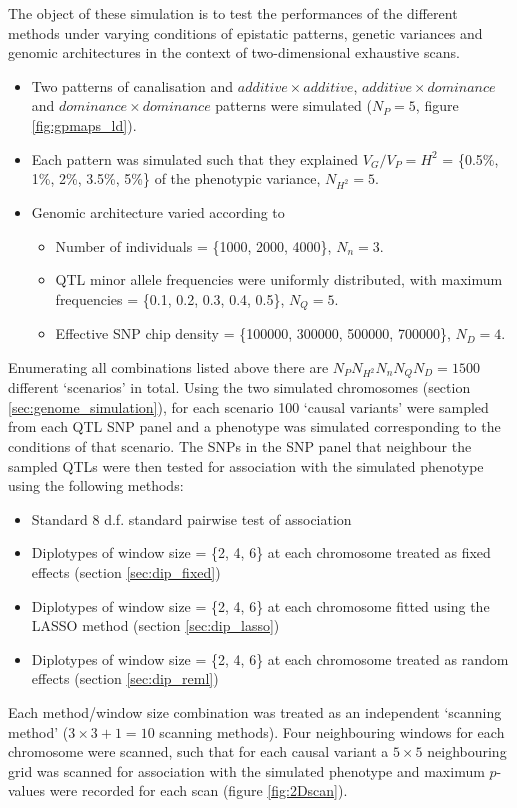The object of these simulation is to test the performances of the different methods under varying conditions of epistatic patterns, genetic variances and genomic architectures in the context of two-dimensional exhaustive scans.

\begin{itemize}
\item Two patterns of canalisation and $additive \times additive$, $additive \times dominance$ and $dominance \times dominance$ patterns were simulated ($N_{P} = 5$, figure \ref{fig:gpmaps_ld}).
\item Each pattern was simulated such that they explained $V_{G} / V_{P} = H^{2}$ = \{0.5\%, 1\%, 2\%, 3.5\%, 5\%\} of the phenotypic variance, $N_{H^{2}} = 5$.
\item Genomic architecture varied according to
\begin{itemize}
\item Number of individuals = \{1000, 2000, 4000\}, $N_{n} = 3$.
\item QTL minor allele frequencies were uniformly distributed, with maximum frequencies = \{0.1, 0.2, 0.3, 0.4, 0.5\}, $N_{Q} = 5$.
\item Effective SNP chip density = \{100000, 300000, 500000, 700000\}, $N_{D} = 4$.
\end{itemize}
\end{itemize}
Enumerating all combinations listed above there are $N_{P}N_{H^{2}}N_{n}N_{Q}N_{D} = 1500$ different `scenarios' in total. Using the two simulated chromosomes (section \ref{sec:genome_simulation}), for each scenario 100 `causal variants' were sampled from each QTL SNP panel and a phenotype was simulated corresponding to the conditions of that scenario. The SNPs in the SNP panel that neighbour the sampled QTLs were then tested for association with the simulated phenotype using the following methods:
\begin{itemize}
\item Standard 8 d.f. standard pairwise test of association
\item Diplotypes of window size = \{2, 4, 6\} at each chromosome treated as fixed effects (section \ref{sec:dip_fixed})
\item Diplotypes of window size = \{2, 4, 6\} at each chromosome fitted using the LASSO method (section \ref{sec:dip_lasso})
\item Diplotypes of window size = \{2, 4, 6\} at each chromosome treated as random effects (section \ref{sec:dip_reml})
\end{itemize}
Each method/window size combination was treated as an independent `scanning method' ($3\times3+1=10$ scanning methods). Four neighbouring windows for each chromosome were scanned, such that for each causal variant a $5 \times 5$ neighbouring grid was scanned for association with the simulated phenotype and maximum $p$-values were recorded for each scan (figure \ref{fig:2Dscan}).

